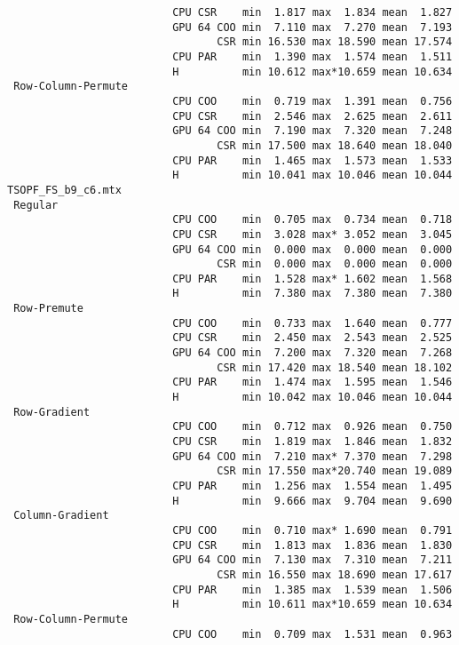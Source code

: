 {\begin{verbatim}
                          CPU CSR    min  1.817 max  1.834 mean  1.827
                          GPU 64 COO min  7.110 max  7.270 mean  7.193
                                 CSR min 16.530 max 18.590 mean 17.574
                          CPU PAR    min  1.390 max  1.574 mean  1.511
                          H          min 10.612 max*10.659 mean 10.634
 Row-Column-Permute
                          CPU COO    min  0.719 max  1.391 mean  0.756
                          CPU CSR    min  2.546 max  2.625 mean  2.611
                          GPU 64 COO min  7.190 max  7.320 mean  7.248
                                 CSR min 17.500 max 18.640 mean 18.040
                          CPU PAR    min  1.465 max  1.573 mean  1.533
                          H          min 10.041 max 10.046 mean 10.044
TSOPF_FS_b9_c6.mtx
 Regular
                          CPU COO    min  0.705 max  0.734 mean  0.718
                          CPU CSR    min  3.028 max* 3.052 mean  3.045
                          GPU 64 COO min  0.000 max  0.000 mean  0.000
                                 CSR min  0.000 max  0.000 mean  0.000
                          CPU PAR    min  1.528 max* 1.602 mean  1.568
                          H          min  7.380 max  7.380 mean  7.380
 Row-Premute
                          CPU COO    min  0.733 max  1.640 mean  0.777
                          CPU CSR    min  2.450 max  2.543 mean  2.525
                          GPU 64 COO min  7.200 max  7.320 mean  7.268
                                 CSR min 17.420 max 18.540 mean 18.102
                          CPU PAR    min  1.474 max  1.595 mean  1.546
                          H          min 10.042 max 10.046 mean 10.044
 Row-Gradient
                          CPU COO    min  0.712 max  0.926 mean  0.750
                          CPU CSR    min  1.819 max  1.846 mean  1.832
                          GPU 64 COO min  7.210 max* 7.370 mean  7.298
                                 CSR min 17.550 max*20.740 mean 19.089
                          CPU PAR    min  1.256 max  1.554 mean  1.495
                          H          min  9.666 max  9.704 mean  9.690
 Column-Gradient
                          CPU COO    min  0.710 max* 1.690 mean  0.791
                          CPU CSR    min  1.813 max  1.836 mean  1.830
                          GPU 64 COO min  7.130 max  7.310 mean  7.211
                                 CSR min 16.550 max 18.690 mean 17.617
                          CPU PAR    min  1.385 max  1.539 mean  1.506
                          H          min 10.611 max*10.659 mean 10.634
 Row-Column-Permute
                          CPU COO    min  0.709 max  1.531 mean  0.963

\end{verbatim}}
